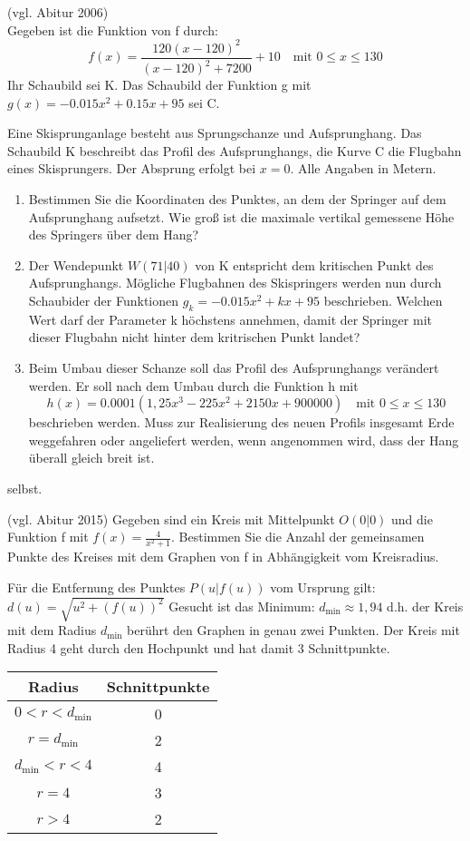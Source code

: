 \aufgabe{} (vgl. Abitur 2006)\\
Gegeben ist die Funktion von f durch:
\begin{equation*}
  f(x)=\frac{120(x-120)^2}{(x-120)^2+7200} + 10 \quad\text{mit $0\leq x \leq 130$}
\end{equation*}
Ihr Schaubild sei K. Das Schaubild der Funktion g mit $g(x)=-0.015x^2+0.15x+95$ sei C.

Eine Skisprunganlage besteht aus Sprungschanze und Aufsprunghang. Das Schaubild K beschreibt das Profil des Aufsprunghangs, die Kurve C die Flugbahn eines Skisprungers. Der Absprung erfolgt bei $x=0$. Alle Angaben in Metern.

\begin{enumerate}
  \item Bestimmen Sie die Koordinaten des Punktes, an dem der Springer auf dem Aufsprunghang aufsetzt. Wie groß ist die maximale vertikal gemessene Höhe des Springers über dem Hang?
  \item Der Wendepunkt $W(71|40)$ von K entspricht dem kritischen Punkt des Aufsprunghangs. Mögliche Flugbahnen des Skispringers werden nun durch Schaubider der Funktionen $g_k=-0.015x^2+kx+95$ beschrieben. Welchen Wert darf der Parameter k höchstens annehmen, damit der Springer mit dieser Flugbahn nicht hinter dem kritrischen Punkt landet?
  \item Beim Umbau dieser Schanze soll das Profil des Aufsprunghangs verändert werden. Er soll nach dem Umbau durch die Funktion h mit
  \begin{equation*}
    h(x)=0.0001(1,25x^3-225x^2+2150x+900000) \quad\text{mit $0\leq x \leq 130$}
  \end{equation*}
  beschrieben werden. Muss zur Realisierung des neuen Profils insgesamt Erde weggefahren oder angeliefert werden, wenn angenommen wird, dass der Hang überall gleich breit ist.
\end{enumerate}
\begin{lsg}{}
selbst.
\end{lsg}

\aufgabe{} (vgl. Abitur 2015)
Gegeben sind ein Kreis mit Mittelpunkt $O(0|0)$ und die Funktion f mit $f(x)=\frac{4}{x^2+1}$. Bestimmen Sie die Anzahl der gemeinsamen Punkte des Kreises mit dem Graphen von f in Abhängigkeit vom Kreisradius.

\begin{lsg}{}
Für die Entfernung des Punktes $P(u|f(u))$ vom Ursprung gilt:
$d(u)=\sqrt{u^2+(f(u))^2}$ Gesucht ist das Minimum:
$d_{\mathrm{min}}\approx 1,94$ d.h. der Kreis mit dem Radius $d_{\mathrm{min}}$ berührt den Graphen in genau zwei Punkten.
Der Kreis mit Radius 4 geht durch den Hochpunkt und hat damit 3 Schnittpunkte.

\bigskip
\noindent
\begin{tabular}{c | c}
  Radius & Schnittpunkte\\
  \hline $0<r<d_{\mathrm{min}}$ & 0\\
  $r=d_{\mathrm{min}}$ & 2\\
  $d_{\mathrm{min}}<r<4$ & 4\\
  $r=4$ & 3\\
  $r>4$ & 2
\end{tabular}
\end{lsg}

